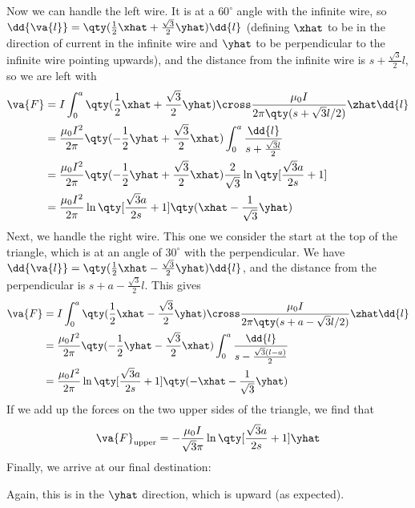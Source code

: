 \documentclass[12pt,a4paper]{article}
\begin{document}
Now we can handle the left wire.
It is at a $60^{\circ}$ angle with the infinite wire, so $\dd{\va{l}} = \qty(\frac{1}{2}\xhat + \frac{\sqrt{3}}{2}\yhat)\dd{l}$ (defining $\xhat$ to be in the direction of current in the infinite wire and $\yhat$ to be perpendicular to the infinite wire pointing upwards), and the distance from the infinite wire is $s + \frac{\sqrt{3}}{2}l$, so we are left with
\begin{align*}
\va{F} &= I\int_{0}^{a} \qty(\frac{1}{2}\xhat + \frac{\sqrt{3}}{2}\yhat) \cross \frac{\mu_0 I}{2 \pi \qty(s + \sqrt{3} l/2)}\zhat \dd{l} \\
&= \frac{\mu_0 I^2}{2 \pi}\qty(-\frac{1}{2}\yhat + \frac{\sqrt{3}}{2}\xhat)\int_{0}^{a} \frac{\dd{l}}{s + \frac{\sqrt{3} l}{2}} \\
&= \frac{\mu_0 I^2}{2 \pi}\qty(-\frac{1}{2}\yhat + \frac{\sqrt{3}}{2}\xhat)\frac{2}{\sqrt{3}}\ln\qty[\frac{\sqrt{3} a}{2 s} + 1] \\
&= \frac{\mu_0 I^2}{2 \pi}\ln\qty[\frac{\sqrt{3} a}{2 s} + 1]\qty(\xhat - \frac{1}{\sqrt{3}}\yhat)
\end{align*}
Next, we handle the right wire. This one we consider the start at the top of the triangle, which is at an angle of $30^{\circ}$ with the perpendicular.
We have $\dd{\va{l}} = \qty(\frac{1}{2}\xhat - \frac{\sqrt{3}}{2}\yhat)\dd{l}$, and the distance from the perpendicular is $s + a - \frac{\sqrt{3}}{2}l$.
This gives
\begin{align*}
\va{F} &= I\int_{0}^{a} \qty(\frac{1}{2}\xhat - \frac{\sqrt{3}}{2}\yhat) \cross \frac{\mu_0 I}{2 \pi \qty(s + a - \sqrt{3} l/2)}\zhat \dd{l} \\
&= \frac{\mu_0 I^2}{2 \pi}\qty(-\frac{1}{2}\yhat - \frac{\sqrt{3}}{2}\xhat)\int_{0}^{a} \frac{\dd{l}}{s - \frac{\sqrt{3} (l-a)}{2}} \\
&= \frac{\mu_0 I^2}{2 \pi}\ln\qty[\frac{\sqrt{3} a}{2 s} + 1]\qty(- \xhat - \frac{1}{\sqrt{3}}\yhat )
\end{align*}
If we add up the forces on the two upper sides of the triangle, we find that
\begin{align*}
\va{F}_{\rm upper} = - \frac{\mu_0 I}{\sqrt{3} \pi}\ln\qty[\frac{\sqrt{3} a}{2 s} + 1] \yhat
\end{align*}
Finally, we arrive at our final destination:
Again, this is in the $\yhat$ direction, which is upward (as expected).
\end{document}
